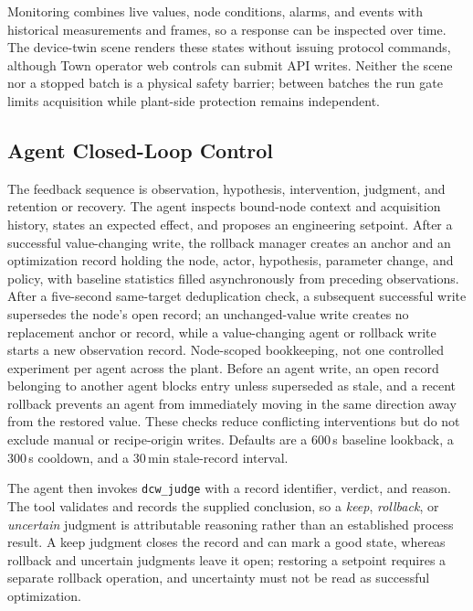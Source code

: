 Monitoring combines live values, node conditions, alarms, and events with
historical measurements and frames, so a response can be inspected over time. The
device-twin scene renders these states without
issuing protocol commands, although Town operator web controls can submit API
writes. Neither the scene nor a stopped batch is a physical safety barrier; between
batches the run gate limits acquisition while plant-side protection remains
independent.

\subsection{Agent Closed-Loop Control}
\label{sec:loop}
The feedback sequence is observation, hypothesis, intervention, judgment, and
retention or recovery. The agent inspects bound-node context and acquisition
history, states an expected effect, and proposes an engineering setpoint. After a
successful value-changing write, the rollback manager creates an anchor and an
optimization record holding the node, actor, hypothesis, parameter change, and
policy, with baseline statistics filled asynchronously from preceding observations.
After a five-second same-target deduplication check, a subsequent successful write
supersedes the node's open record; an unchanged-value write creates no replacement
anchor or record, while a value-changing agent or rollback write starts a new
observation record. Node-scoped bookkeeping, not one controlled experiment per
agent across the plant. Before an agent write, an open record belonging to another
agent blocks entry unless superseded as stale, and a recent rollback prevents an
agent from immediately moving in the same direction away from the restored value.
These checks reduce conflicting interventions but do not exclude manual or
recipe-origin writes. Defaults are a 600\,s baseline lookback, a 300\,s cooldown,
and a 30\,min stale-record interval.

The agent then invokes \texttt{dcw\_judge} with a record identifier, verdict, and
reason. The tool validates and records the supplied conclusion, so a \emph{keep}, \emph{rollback}, or \emph{uncertain} judgment is
attributable reasoning rather than an established process result. A keep judgment
closes the record and can mark a good state, whereas rollback and uncertain
judgments leave it open; restoring a setpoint requires a separate rollback
operation, and uncertainty must not be read as successful optimization.

